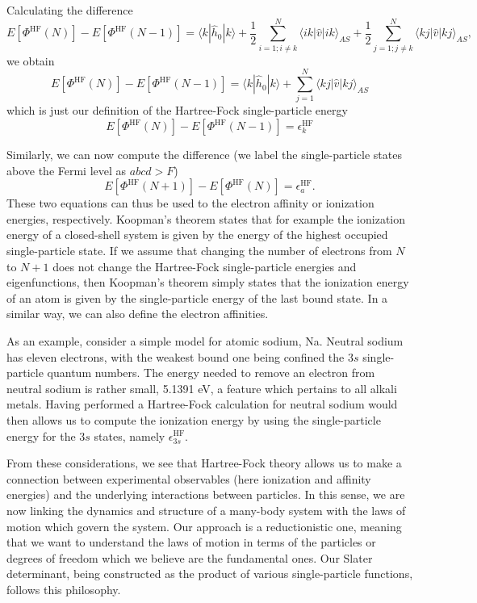\documentclass[%
oneside,                 %
final,                   %
10pt]{article}
\begin{document}
Calculating the difference 
\[
  E[\Phi^{\mathrm{HF}}(N)]-   E[\Phi^{\mathrm{HF}}(N-1)] = \langle k | \hat{h}_0 | k \rangle +
  \frac{1}{2}\sum_{i=1;i\ne k}^N\langle ik|\hat{v}|ik\rangle_{AS} + \frac{1}{2}\sum_{j=1;j\ne k}^N\langle kj|\hat{v}|kj\rangle_{AS},
\]
we obtain
\[
  E[\Phi^{\mathrm{HF}}(N)]-   E[\Phi^{\mathrm{HF}}(N-1)] = \langle k | \hat{h}_0 | k \rangle +\sum_{j=1}^N\langle kj|\hat{v}|kj\rangle_{AS}
\]
which is just our definition of the Hartree-Fock single-particle energy
\[
  E[\Phi^{\mathrm{HF}}(N)]-   E[\Phi^{\mathrm{HF}}(N-1)] = \epsilon_k^{\mathrm{HF}} 
\]



Similarly, we can now compute the difference (we label the single-particle states above the Fermi level as $abcd > F$)
\[
  E[\Phi^{\mathrm{HF}}(N+1)]-   E[\Phi^{\mathrm{HF}}(N)]= \epsilon_a^{\mathrm{HF}}. 
\]
These two equations can thus be used to the electron affinity or ionization energies, respectively. 
Koopman's theorem states that for example the ionization energy of a closed-shell system is given by the energy of the highest occupied single-particle state.  If we assume that changing the number of electrons from $N$ to $N+1$ does not change the Hartree-Fock single-particle energies and eigenfunctions, then Koopman's theorem simply states that the ionization energy of an atom is given by the single-particle energy of the last bound state. In a similar way, we can also define the electron affinities. 




As an example, consider a simple model for atomic sodium, Na. Neutral sodium has eleven electrons, 
with the weakest bound one being confined the $3s$ single-particle quantum numbers. The energy needed to remove an electron from neutral sodium is rather small, 5.1391 eV, a feature which pertains to all alkali metals.
Having performed a  Hartree-Fock calculation for neutral sodium would then allows us to compute the
ionization energy by using the single-particle energy for the $3s$ states, namely $\epsilon_{3s}^{\mathrm{HF}}$. 

From these considerations, we see that Hartree-Fock theory allows us to make a connection between experimental 
observables (here ionization and affinity energies) and the underlying interactions between particles.  
In this sense, we are now linking the dynamics and structure of a many-body system with the laws of motion which govern the system. Our approach is a reductionistic one, meaning that we want to understand the laws of motion 
in terms of the particles or degrees of freedom which we believe are the fundamental ones. Our Slater determinant, being constructed as the product of various single-particle functions, follows this philosophy.
\end{document}
